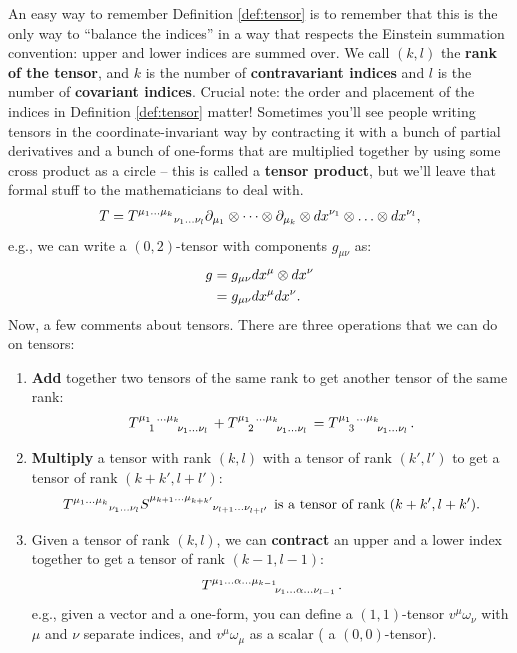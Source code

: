 \documentclass[11pt]{article}
\newcommand{\kltensor}[0]{\tensor{T}{^{\mu_1 ... \mu_k}}_{\nu_1 ... \nu_l}}
\theoremstyle{definition}
\begin{document}
An easy way to remember Definition \ref{def:tensor} is to remember that this is the only way to ``balance the indices'' in a way that respects the Einstein summation convention: upper and lower indices are summed over. We call \( (k,l) \) the \textbf{rank of the tensor}, and \( k \) is the number of \textbf{contravariant indices} and \( l \) is the number of \textbf{covariant indices}. Crucial note: the order and placement of the indices in Definition \ref{def:tensor} matter! 
\newline
\newline
Sometimes you'll see people writing tensors in the coordinate-invariant way by contracting it with a bunch of partial derivatives and a bunch of one-forms that are multiplied together by using some cross product as a circle -- this is called a \textbf{tensor product}, but we'll leave that formal stuff to the mathematicians to deal with. 
\begin{align*}
	T = \kltensor \partial_{\mu_1} \tens \cdots \tens \partial_{\mu_k} \tens dx^{\nu_1} \tens \hdots \tens dx^{\nu_l}, 
\end{align*}
e.g., we can write a \( (0,2) \)-tensor with components \( g_{\mu \nu} \) as: 
\begin{align*}
	g & = g_{\mu \nu} dx^\mu \tens dx^{\nu} \\
	& = g_{\mu \nu} dx^{\mu} dx^{\nu}.
\end{align*}
Now, a few comments about tensors. There are three operations that we can do on tensors: 
\begin{enumerate}[noitemsep]
	\item \textbf{Add} together two tensors of the same rank to get another tensor of the same rank: 
	\begin{align*}
		\tensor{T}{^{\mu_1}_1^{...\mu_k}_{\nu_1 ... \nu_l}} + \tensor{T}{^{\mu_1}_2^{...\mu_k}_{\nu_1 ... \nu_l}} = \tensor{T}{^{\mu_1}_3^{...\mu_k}_{\nu_1 ... \nu_l}}. 
	\end{align*}
	\item \textbf{Multiply} a tensor with rank \( (k,l) \) with a tensor of rank \( (k', l') \) to get a tensor of rank \( (k+k', l+l') \): 
	\begin{align*}
		\kltensor \tensor{S}{^{\mu_{k+1} ... \mu_{k+k'}}_{\nu_{l+1}...\nu_{l+l'}}} \text{ is a tensor of rank \( (k+k', l+k') \).}
	\end{align*}
	\item Given a tensor of rank \( (k,l) \), we can \textbf{contract} an upper and a lower index together to get a tensor of rank \( (k-1, l-1) \): 
	\begin{align*}
		\tensor{T}{^{\mu_1 ... \alpha ... \mu_{k-1}}_{\nu_1 ... \alpha ... \nu_{l-1}}}.
	\end{align*}
	e.g., given a vector and a one-form, you can define a \( (1,1) \)-tensor \( v^\mu \omega_\nu \) with \( \mu \) and \( \nu \) separate indices, and \( v^\mu \omega_\mu \) as a scalar ( a \( (0,0) \)-tensor).
\end{enumerate}
\end{document}
